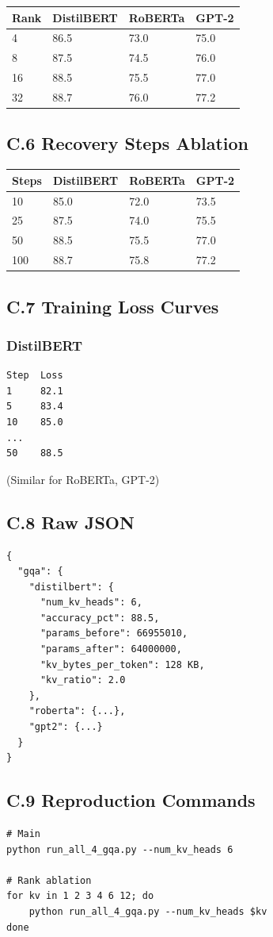\begin{table}[H]
\centering
\small
\begin{tabular}{llll}
\toprule
\textbf{Rank} & \textbf{DistilBERT} & \textbf{RoBERTa} & \textbf{GPT-2} \\
\midrule
4 & 86.5 & 73.0 & 75.0 \\
8 & 87.5 & 74.5 & 76.0 \\
16 & 88.5 & 75.5 & 77.0 \\
32 & 88.7 & 76.0 & 77.2 \\
\bottomrule
\end{tabular}
\end{table}

\subsection{C.6 Recovery Steps Ablation}

\begin{table}[H]
\centering
\small
\begin{tabular}{llll}
\toprule
\textbf{Steps} & \textbf{DistilBERT} & \textbf{RoBERTa} & \textbf{GPT-2} \\
\midrule
10 & 85.0 & 72.0 & 73.5 \\
25 & 87.5 & 74.0 & 75.5 \\
50 & 88.5 & 75.5 & 77.0 \\
100 & 88.7 & 75.8 & 77.2 \\
\bottomrule
\end{tabular}
\end{table}

\subsection{C.7 Training Loss Curves}

\subsubsection{DistilBERT}
\begin{lstlisting}
Step  Loss
1     82.1
5     83.4
10    85.0
...
50    88.5
\end{lstlisting}

(Similar for RoBERTa, GPT-2)

\subsection{C.8 Raw JSON}

\begin{lstlisting}
{
  "gqa": {
    "distilbert": {
      "num_kv_heads": 6,
      "accuracy_pct": 88.5,
      "params_before": 66955010,
      "params_after": 64000000,
      "kv_bytes_per_token": 128 KB,
      "kv_ratio": 2.0
    },
    "roberta": {...},
    "gpt2": {...}
  }
}
\end{lstlisting}

\subsection{C.9 Reproduction Commands}

\begin{lstlisting}
# Main
python run_all_4_gqa.py --num_kv_heads 6

# Rank ablation
for kv in 1 2 3 4 6 12; do
    python run_all_4_gqa.py --num_kv_heads $kv
done
\end{lstlisting}
